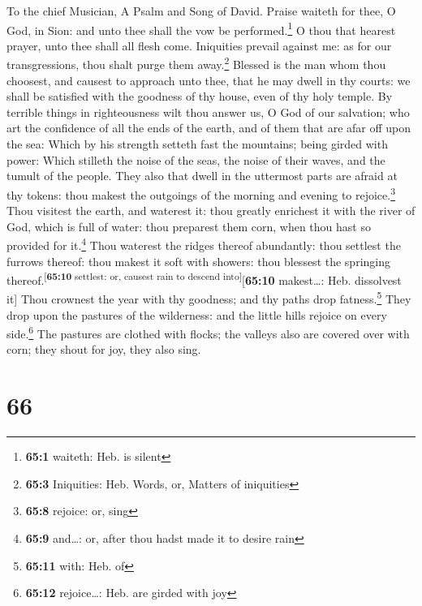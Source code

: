 To the chief Musician, A Psalm and Song of David.  Praise
waiteth for thee, O God, in Sion: and unto thee shall the vow be
performed.\footnote{\textbf{65:1} waiteth: Heb. is silent}
 O thou that hearest prayer, unto thee shall all flesh
come.  Iniquities prevail against me: as for our
transgressions, thou shalt purge them away.\footnote{\textbf{65:3}
  Iniquities: Heb. Words, or, Matters of iniquities} 
Blessed is the man whom thou choosest, and causest to approach unto
thee, that he may dwell in thy courts: we shall be satisfied with the
goodness of thy house, even of thy holy temple.  By
terrible things in righteousness wilt thou answer us, O God of our
salvation; who art the confidence of all the ends of the earth, and of
them that are afar off upon the sea:  Which by his
strength setteth fast the mountains; being girded with power:
 Which stilleth the noise of the seas, the noise of their
waves, and the tumult of the people.  They also that dwell
in the uttermost parts are afraid at thy tokens: thou makest the
outgoings of the morning and evening to rejoice.\footnote{\textbf{65:8}
  rejoice: or, sing}  Thou visitest the earth, and
waterest it: thou greatly enrichest it with the river of God, which is
full of water: thou preparest them corn, when thou hast so provided for
it.\footnote{\textbf{65:9} and\ldots: or, after thou hadst made it to
  desire rain}  Thou waterest the ridges thereof
abundantly: thou settlest the furrows thereof: thou makest it soft with
showers: thou blessest the springing
thereof.\textsuperscript{{[}\textbf{65:10} settlest: or, causest rain to
descend into{]}}{[}\textbf{65:10} makest\ldots: Heb. dissolvest it{]}
 Thou crownest the year with thy goodness; and thy paths
drop fatness.\footnote{\textbf{65:11} with: Heb. of} 
They drop upon the pastures of the wilderness: and the little hills
rejoice on every side.\footnote{\textbf{65:12} rejoice\ldots: Heb. are
  girded with joy}  The pastures are clothed with flocks;
the valleys also are covered over with corn; they shout for joy, they
also sing.

\hypertarget{section-65}{%
\section{66}\label{section-65}}

